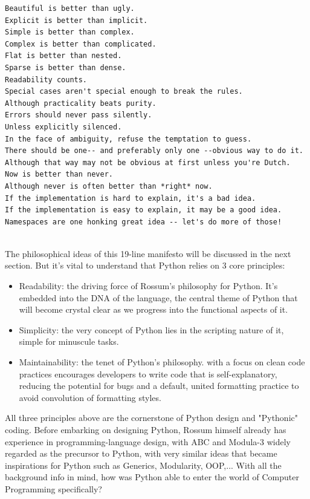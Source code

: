 \documentclass[twoside,final]{hcmut-report}
\begin{document}
\begin{center}
\begin{BVerbatim}
Beautiful is better than ugly.
Explicit is better than implicit.
Simple is better than complex.
Complex is better than complicated.
Flat is better than nested.
Sparse is better than dense.
Readability counts.
Special cases aren't special enough to break the rules.
Although practicality beats purity.
Errors should never pass silently.
Unless explicitly silenced.
In the face of ambiguity, refuse the temptation to guess.
There should be one-- and preferably only one --obvious way to do it.
Although that way may not be obvious at first unless you're Dutch.
Now is better than never.
Although never is often better than *right* now.
If the implementation is hard to explain, it's a bad idea.
If the implementation is easy to explain, it may be a good idea.
Namespaces are one honking great idea -- let's do more of those!


\end{BVerbatim}
\end{center}
The philosophical ideas of this 19-line manifesto will be discussed in the next section. But it's vital to understand that Python relies on 3 core principles:
\begin{itemize}
\item Readability: the driving force of Rossum's philosophy for Python. It's embedded into the DNA of the language, the central theme of Python that will become crystal clear as we progress into the functional aspects of it.
\item Simplicity: the very concept of Python lies in the scripting nature of it, simple for minuscule tasks.
\item Maintainability: the tenet of Python's philosophy. with a focus on clean code practices encourages developers to write code that is self-explanatory, reducing the potential for bugs and a default, united formatting practice to avoid convolution of formatting styles.


\end{itemize}
\hspace*{3mm} All three principles above are the cornerstone of Python design and "Pythonic" coding. Before embarking on designing Python, Rossum himself already has experience in programming-language design, with ABC and Modula-3 widely regarded as the precursor to Python, with very similar ideas that became inspirations for Python such as Generics, Modularity, OOP,...  With all the background info in mind, how was Python able to enter the world of Computer Programming specifically?
\end{document}
